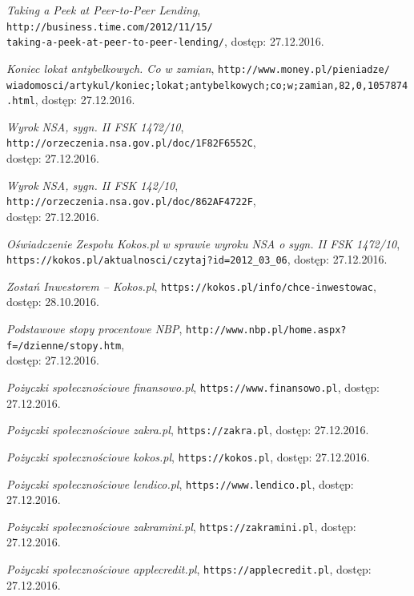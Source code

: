 \documentclass[a4paper,twoside,titlepage,openright]{book}
\begin{document}
\begin{thebibliography}{99}
 \textit{Taking a Peek at Peer-to-Peer Lending}, 
\texttt{http://business.time.com/2012/11/15/\\taking-a-peek-at-peer-to-peer-lending/}, dostęp: 27.12.2016.

 \textit{Koniec lokat antybelkowych. Co w zamian}, 
\texttt{http://www.money.pl/pieniadze/\\wiadomosci/artykul/koniec;lokat;antybelkowych;co;w;zamian,82,0,1057874.html}, dostęp: 27.12.2016.

 \textit{Wyrok NSA, sygn. II FSK 1472/10}, \texttt{http://orzeczenia.nsa.gov.pl/doc/1F82F6552C}, \\dostęp: 27.12.2016.

 \textit{Wyrok NSA, sygn. II FSK 142/10}, 
\texttt{http://orzeczenia.nsa.gov.pl/doc/862AF4722F}, \\dostęp: 27.12.2016.

 \textit{Oświadczenie Zespołu Kokos.pl w sprawie wyroku NSA o sygn. II FSK 1472/10}, \\
\texttt{https://kokos.pl/aktualnosci/czytaj?id=2012\_03\_06}, dostęp: 27.12.2016.

 \textit{Zostań Inwestorem -- Kokos.pl}, 
\texttt{https://kokos.pl/info/chce-inwestowac}, \\dostęp: 28.10.2016.

 \textit{Podstawowe stopy procentowe NBP}, 
\texttt{http://www.nbp.pl/home.aspx?f=/dzienne/stopy.htm}, \\dostęp: 27.12.2016.

 \textit{Pożyczki społecznościowe finansowo.pl}, 
\texttt{https://www.finansowo.pl}, dostęp: 27.12.2016.

 \textit{Pożyczki społecznościowe zakra.pl}, 
\texttt{https://zakra.pl}, dostęp: 27.12.2016.

 \textit{Pożyczki społecznościowe kokos.pl}, 
\texttt{https://kokos.pl}, dostęp: 27.12.2016.

 \textit{Pożyczki społecznościowe lendico.pl}, 
\texttt{https://www.lendico.pl}, dostęp: 27.12.2016.

 \textit{Pożyczki społecznościowe zakramini.pl}, 
\texttt{https://zakramini.pl}, dostęp: 27.12.2016.

 \textit{Pożyczki społecznościowe applecredit.pl}, 
\texttt{https://applecredit.pl}, dostęp: 27.12.2016.


\end{thebibliography}
\end{document}
